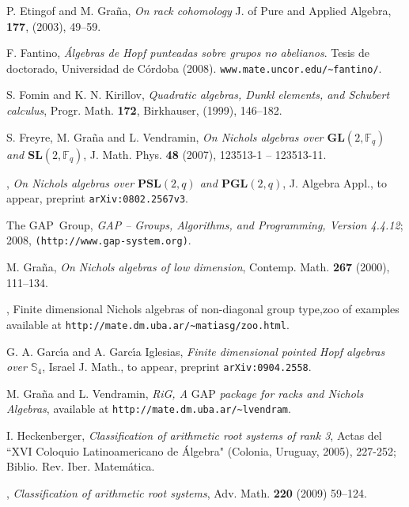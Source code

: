 \documentclass[11pt]{amsart} \textheight 22cm
\renewcommand{\^}[1]{\mbox{$^{\left( #1 \right)}$}}
\renewcommand{\_}[1]{\mbox{$_{\left( #1 \right)}$}}
\theoremstyle{plain}
\theoremstyle{definition}
\theoremstyle{remark}
\newcommand\sk{\mathbb S_4}
\theoremstyle{remark}
\begin{document}
\begin{thebibliography}{AFGV}
 P. Etingof and M. Gra\~na,
    \emph{On rack cohomology} J. of Pure and Applied Algebra, \textbf{177}, (2003), 49--59.

 F. Fantino,
    \emph{\'Algebras de Hopf punteadas sobre grupos no abelianos}.
    Tesis de doc\-to\-ra\-do, Universidad de C\'ordoba (2008).
    \texttt{www.mate.uncor.edu/\~{}fantino/}.

 S. Fomin and  K. N. Kirillov,  {\it Quadratic algebras, Dunkl
elements, and Schubert calculus}, Progr. Math.    {\bf 172},
Birkhauser, (1999),  146--182.

   S. Freyre,  M. Gra\~na and  L. Vendramin,
\emph{On Nichols algebras over $\mathbf{GL}(2,\mathbb{F}_q)$ and
${\mathbf{SL}(2,\mathbb{F}_q)}$}, J. Math. Phys. \textbf{48}
(2007), 123513-1 -- 123513-11.

  \bysame,
\emph{On Nichols algebras over $\mathbf{PSL}(2,q)$ and
${\mathbf{PGL}(2,q)}$}, J. Algebra Appl., to appear, preprint
\texttt{arXiv:0802.2567v3}.



 The GAP~Group,
    \emph{GAP -- Groups, Algorithms, and Programming, Version 4.4.12}; 2008,
    \verb+(http://www.gap-system.org)+.

 M. Gra\~na, \emph{On Nichols algebras of low dimension},
 Contemp. Math. {\bf 267}  (2000), 111--134.

 \bysame, Finite dimensional Nichols algebras of non-diagonal group
type,zoo of examples available at
\verb+http://mate.dm.uba.ar/~matiasg/zoo.html+.

 G. A. Garc\'{\i}a and A. Garc\'{\i}a Iglesias,
    \emph{Finite dimensional pointed Hopf algebras over $\sk$},
Israel J. Math., to appear, preprint \texttt{arXiv:0904.2558}.

  M. Gra\~na  and  L. Vendramin,
\emph{RiG, A} \textsf{GAP} \emph{package for racks and Nichols Algebras},
available at \verb+http://mate.dm.uba.ar/~lvendram+.

 I. Heckenberger,
   {\em Classification of arithmetic root systems of rank 3},
Actas del ``XVI Coloquio Latinoamericano de \'Algebra" (Colonia,
Uruguay, 2005), 227-252; Biblio. Rev. Iber. Matem\'atica.

{} \bysame,
    {\em Classification of arithmetic root systems},
    Adv. Math. {\bf 220} (2009) 59--124.





\end{thebibliography}
\end{document}
